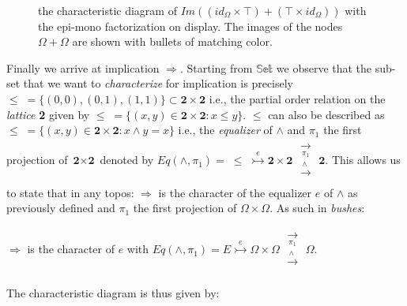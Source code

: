 \begin{figure}[h]

\caption{the characteristic diagram of $Im((id_\Omega \times \top) + (\top \times id_\Omega))$ with the epi-mono factorization on display. \newline
	The images of the nodes $\Omega + \Omega$ are shown with bullets of matching color.  }
\end{figure}


\newpage
Finally we arrive at implication $\Rightarrow$. \newline
Starting from $\mathbb{Set}$ we observe that the sub-set that we want to \emph{characterize} for implication is precisely $\leq \;= \{(0,0), (0,1), (1,1)\} \subset \textbf{2} \times \textbf{2}$ i.e., the partial order relation on the \emph{lattice} \textbf{2} given by $\leq \;= \{(x,y) \in \textbf{2} \times \textbf{2} : x \leq y\}$. $\leq$ can also be described as $\leq \;= \{(x,y) \in \textbf{2} \times \textbf{2} : x \land y = x\}$ i.e., the \emph{equalizer}  of $\land$ and $\pi_1$ the first projection of $\textbf{2} \times \textbf{2}$ denoted by $Eq(\land,\pi_1) = \;\leq \;\overset{e}{\rightarrowtail} \textbf{2} \times \textbf{2}\; \substack{\xrightarrow[\pi_1]{}\\[-2.2em] \xrightarrow[]{\land\;}} \; \textbf{2}$. \newline
This allows us to state that in any topos: \newline $\Rightarrow$ is the character of the equalizer $e$ of $\land$ as previously defined and $\pi_1$ the first projection of $\Omega \times \Omega$. As such in \emph{bushes}:

\begin{definition}[$\Rightarrow$] 
$\Rightarrow$ is the character of $e$ with $Eq(\land,\pi_1) = E \overset{e}{\rightarrowtail} \Omega \times \Omega\; \substack{\xrightarrow[\pi_1]{}\\[-2.2em] \xrightarrow[]{\land\;}} \; \Omega$.
\end{definition}
The characteristic diagram is thus given by:

